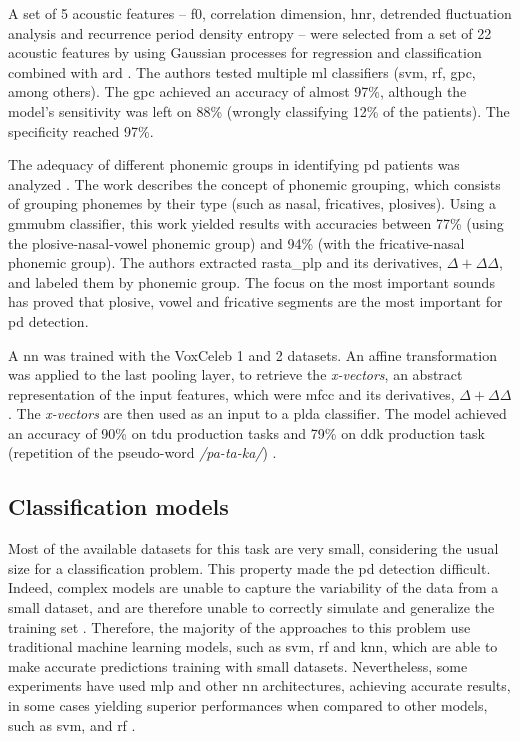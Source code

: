 A set of 5 acoustic features -- \gls{f0}, correlation dimension,  \gls{hnr}, detrended fluctuation analysis and recurrence period density entropy -- were selected from a set of 22 acoustic features by using Gaussian processes for regression and classification combined with \gls{ard} \cite{parkinson_acoustic_despotovic}. The authors tested multiple \gls{ml} classifiers (\gls{svm}, \gls{rf}, \gls{gpc}, among others). The \gls{gpc} achieved an accuracy of almost 97\%, although the model's sensitivity was left on 88\% (wrongly classifying 12\% of the patients). The specificity reached 97\%.

The adequacy of different phonemic groups in identifying \gls{pd} patients was analyzed \cite{parkinson_phonemic_relevance}. The work describes the concept of phonemic grouping, which consists of grouping phonemes by their type (such as nasal, fricatives, plosives). Using a \gls{gmmubm} classifier, this work yielded results with accuracies between 77\% (using the plosive-nasal-vowel phonemic group) and 94\% (with the fricative-nasal phonemic group). The authors extracted \gls{rasta_plp} \cite{rastaPLP} and its derivatives, $\Delta + \Delta \Delta$, and labeled them by phonemic group. The focus on the most important sounds has proved that plosive, vowel and fricative segments are the most important for \gls{pd} detection.

A \gls{nn} was trained with the VoxCeleb 1 \cite{voxceleb1} and 2 \cite{voxceleb2} datasets. An affine transformation was applied to the last pooling layer, to retrieve the \textit{x-vectors}, an abstract representation of the input features, which were \gls{mfcc} and its derivatives, $\Delta + \Delta \Delta$. The \textit{x-vectors} are then used as an input to a \gls{plda} classifier. The model achieved an accuracy of 90\% on \gls{tdu} production tasks and 79\% on \gls{ddk} production task (repetition of the pseudo-word \textit{/pa-ta-ka/}) \cite{x_vector_parkinson}.

\subsection{Classification models}

Most of the available datasets for this task are very small, considering the usual size for a classification problem. This property made the \gls{pd} detection difficult. Indeed, complex models are unable to capture the variability of the data from a small dataset, and are therefore unable to correctly simulate and generalize the training set \cite{underfitting_small_datasets}. Therefore, the majority of the approaches to this problem use traditional machine learning models, such as \gls{svm}, \gls{rf} and \gls{knn}, which are able to make accurate predictions training with small datasets. Nevertheless, some experiments have used \gls{mlp} and other \gls{nn} architectures, achieving accurate results, in some cases yielding superior performances when compared to other models, such as \gls{svm}, and \gls{rf} \cite{deep_mlp_parkinson}.

